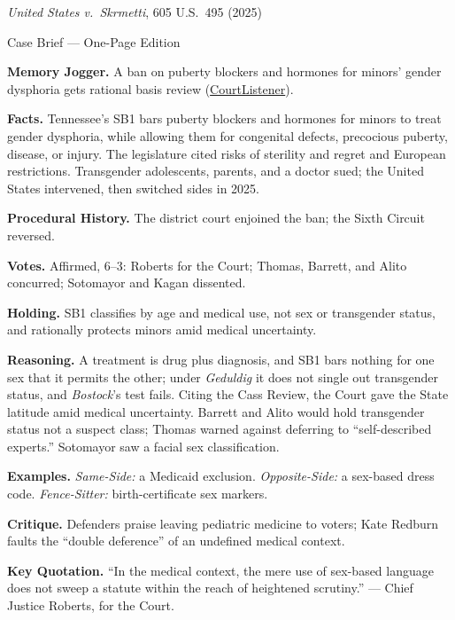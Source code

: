 \documentclass[12pt]{article}
\begin{document}
\begin{center}
{\Large \textit{United States v.\ Skrmetti}, 605 U.S.\ 495 (2025)\par}
\vspace{0.3em}
{\normalsize Case Brief --- One-Page Edition\par}
\end{center}

\textbf{Memory Jogger.} A ban on puberty blockers and hormones for minors' gender dysphoria gets rational basis review (\href{https://www.courtlistener.com/opinion/10776831/united-states-v-skrmetti/}{CourtListener}).

\textbf{Facts.} Tennessee's SB1 bars puberty blockers and hormones for minors to treat gender dysphoria, while allowing them for congenital defects, precocious puberty, disease, or injury. The legislature cited risks of sterility and regret and European restrictions. Transgender adolescents, parents, and a doctor sued; the United States intervened, then switched sides in 2025.

\textbf{Procedural History.} The district court enjoined the ban; the Sixth Circuit reversed.

\textbf{Votes.} Affirmed, 6--3: Roberts for the Court; Thomas, Barrett, and Alito concurred; Sotomayor and Kagan dissented.

\textbf{Holding.} SB1 classifies by age and medical use, not sex or transgender status, and rationally protects minors amid medical uncertainty.

\textbf{Reasoning.} A treatment is drug plus diagnosis, and SB1 bars nothing for one sex that it permits the other; under \textit{Geduldig} it does not single out transgender status, and \textit{Bostock}'s test fails. Citing the Cass Review, the Court gave the State latitude amid medical uncertainty. Barrett and Alito would hold transgender status not a suspect class; Thomas warned against deferring to ``self-described experts.'' Sotomayor saw a facial sex classification.

\textbf{Examples.} \emph{Same-Side:} a Medicaid exclusion. \emph{Opposite-Side:} a sex-based dress code. \emph{Fence-Sitter:} birth-certificate sex markers.

\textbf{Critique.} Defenders praise leaving pediatric medicine to voters; Kate Redburn faults the ``double deference'' of an undefined medical context.

\textbf{Key Quotation.} ``In the medical context, the mere use of sex-based language does not sweep a statute within the reach of heightened scrutiny.'' --- Chief Justice Roberts, for the Court.
\end{document}
